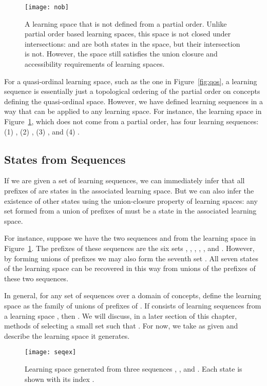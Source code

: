 \documentclass[11pt]{llncs}
\begin{document}
{\begin{figure}[t]
\centering\texttt{[image: nob]}
\caption{A learning space that is not defined from a partial order. Unlike partial order based learning spaces, this space is not closed under intersections:  and  are both states in the space, but their intersection  is not. However, the space still satisfies the union closure and accessibility requirements of learning spaces.}
\label{fig:nob}
\end{figure}

For a quasi-ordinal learning space, such as the one in Figure~\ref{fig:qos}, a learning sequence is essentially just a topological ordering of the partial order on concepts defining the quasi-ordinal space. However, we have defined learning sequences in a way that can be applied to any learning space. For instance, the learning space in Figure~\ref{fig:nob}, which does not come from a partial order, has four learning sequences: (1) , (2) , (3) , and (4) .

\subsection{States from Sequences}

If we are given a set  of learning sequences, we can immediately infer that all prefixes of  are states in the associated learning space. But we can also infer the existence of other states using the union-closure property of learning spaces: any set formed from a union of prefixes of  must be a state in the associated learning space.

For instance, suppose we have the two sequences  and  from the learning space in Figure~\ref{fig:nob}. The prefixes of these sequences are the six sets , , , , , and . However, by forming unions of prefixes we may also form the seventh set . All seven states of the learning space can be recovered in this way from unions of the prefixes of these two sequences.

In general, for any set of sequences  over a domain of concepts, define the learning space  as the family of unions of prefixes of .
If  consists of learning sequences from a learning space , then
. We will discuss, in a later section of this chapter, methods of selecting a small set 
such that . For now, we take  as given and describe the learning space  it generates.

\begin{figure}[t]
\centering\texttt{[image: seqex]}
\caption{Learning space  generated from three sequences
, , and . Each state is shown with its index .}
\label{fig:seqex}
\end{figure}

}
\end{document}
